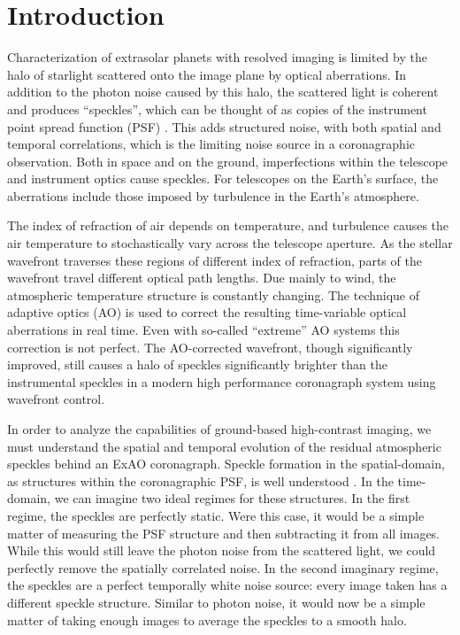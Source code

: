 \documentclass[10pt,preprint]{aastex631}
\begin{document}
\section{Introduction}

Characterization of extrasolar planets with resolved imaging is limited by the halo of starlight scattered onto the image plane by optical aberrations.  In addition to the photon noise caused by this halo, the scattered light is coherent and produces ``speckles'', which can be thought of as copies of the instrument point spread function (PSF) \citep{1995PASP..107..386M}.  This adds structured noise, with both spatial and temporal correlations, which is the limiting noise source in a coronagraphic observation.    Both in space and on the ground, imperfections within the telescope and instrument optics cause speckles.   For telescopes on the Earth's surface, the aberrations include those imposed by turbulence in the Earth's atmosphere. 

The index of refraction of air depends on temperature, and turbulence causes the air temperature to stochastically vary across the telescope aperture.  As the stellar wavefront traverses these regions of different index of refraction, parts of the wavefront travel different optical path lengths.  Due mainly to wind, the atmospheric temperature structure is constantly changing.  The technique of adaptive optics (AO) is used to correct the resulting time-variable optical aberrations in real time.  Even with so-called ``extreme'' AO systems \citep[ExAO, ][]{2018ARAA..56..315G} this correction is not perfect.  The AO-corrected wavefront, though significantly improved, still causes a halo of speckles significantly brighter than the instrumental speckles in a modern high performance coronagraph system using wavefront control.

In order to analyze the capabilities of ground-based high-contrast imaging, we must understand the spatial and temporal evolution of the residual atmospheric speckles behind an ExAO coronagraph.  Speckle formation in the spatial-domain, as structures within the coronagraphic PSF, is well understood \citep{2001ApJ...558L..71B,2003ApJ...596..702P,2007ApJ...669..642S}.  In the time-domain, we can imagine two ideal regimes for these structures.  In the first regime, the speckles are perfectly static.  Were this case, it would be a simple matter of measuring the PSF structure and then subtracting it from all images.  While this would still leave the photon noise from the scattered light, we could perfectly remove the spatially correlated noise.  In the second imaginary regime, the speckles are a perfect temporally white noise source: every image taken has a different speckle structure.  Similar to photon noise, it would now be a simple matter of taking enough images to average the speckles to a smooth halo.
\end{document}
